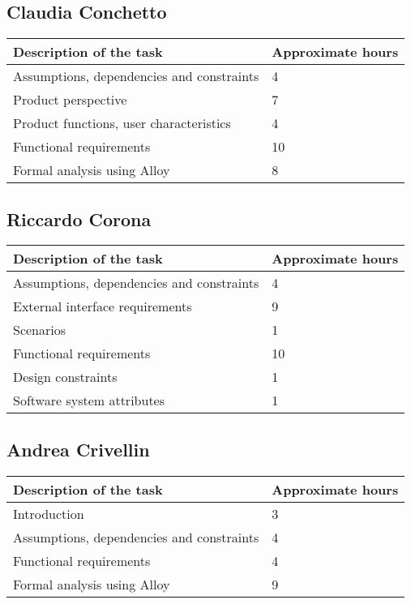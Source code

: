 
%

\subsection{Claudia Conchetto}
\begin{table}[h!]
\begin{tabular}{|l|l|}
\hline
\textbf{Description of the task} & \textbf{Approximate hours} \\ \hline
Assumptions, dependencies and constraints & 4 \\ \hline
Product perspective & 7 \\ \hline
Product functions, user characteristics & 4 \\ \hline
Functional requirements & 10 \\ \hline
Formal analysis using Alloy & 8 \\ \hline
\end{tabular}
\end{table}

\subsection{Riccardo Corona}
\begin{table}[h!]
\begin{tabular}{|l|l|}
\hline
\textbf{Description of the task} & \textbf{Approximate hours} \\ \hline
Assumptions, dependencies and constraints & 4 \\ \hline
External interface requirements & 9 \\ \hline
Scenarios & 1 \\ \hline
Functional requirements & 10 \\ \hline
Design constraints & 1 \\ \hline
Software system attributes & 1 \\ \hline
\end{tabular}
\end{table}

\subsection{Andrea Crivellin}
\begin{table}[h!]
\begin{tabular}{|l|l|}
\hline
\textbf{Description of the task} & \textbf{Approximate hours} \\ \hline
Introduction & 3 \\ \hline
Assumptions, dependencies and constraints & 4 \\ \hline
Functional requirements & 4 \\ \hline
Formal analysis using Alloy & 9 \\ \hline
\end{tabular}
\end{table}

%